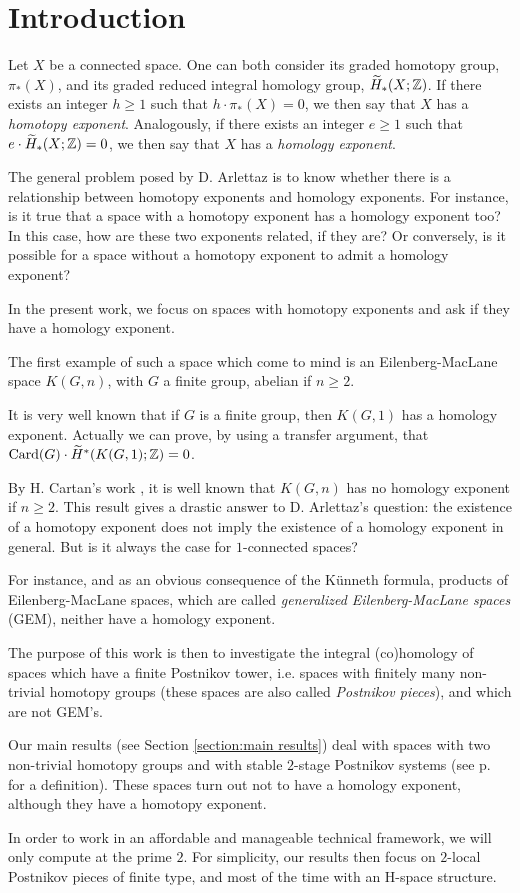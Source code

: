 \chapter{Introduction}

Let $X$ be a connected space. One can both consider its graded homotopy group, $\pi_*(X)$, and its graded reduced integral homology group, $\widetilde{H}_*(X;\mathbb{Z})$. If there exists an integer $h\geq1$ such that $h\cdot\pi_*(X)=0$, we then say that $X$ has a {\it homotopy exponent}. Analogously, if there exists an integer $e\geq1$ such that $e\cdot\widetilde{H}_*(X;\mathbb{Z})=0$, we then say that $X$ has a {\it homology exponent}. 

The general problem posed by D. Arlettaz is to know whether there is a relationship between homotopy exponents and homology exponents. For instance, is it true that a space with a homotopy exponent has a homology exponent too? In this case, how are these two exponents related, if they are? Or conversely, is it possible for a space without a homotopy exponent to admit a homology exponent?

In the present work, we focus on spaces with homotopy exponents and ask if they have a homology exponent.

The first example of such a space which come to mind is an Eilenberg-MacLane space $K(G,n)$, with $G$ a finite group, abelian if $n\geq2$. 

It is very well known that if $G$ is a finite group, then $K(G,1)$ has a homology exponent. Actually we can prove, by using a transfer argument, that $\operatorname{Card}(G)\cdot\widetilde{H}^*(K(G,1);\mathbb{Z})=0$.

By H. Cartan's work \cite{Ca55}, it is well known that $K(G,n)$ has no homology exponent if $n\geq2$. This result gives a drastic answer to D. Arlettaz's question: the existence of a homotopy exponent does not imply the existence of a homology exponent in general. But is it always the case for $1$-connected spaces?

For instance, and as an obvious consequence of the K\"unneth formula, products of Eilenberg-MacLane spaces, which are called {\it generalized Eilenberg-MacLane spaces} (GEM), neither have a homology exponent.

The purpose of this work is then to investigate the integral (co)homology of spaces which have a finite Postnikov tower, i.e. spaces with finitely many non-trivial homotopy groups (these spaces are also called {\it Postnikov pieces}), and which are not GEM's.

Our main results (see Section \ref{section:main results}) deal with spaces with two non-trivial homotopy groups and with stable $2$-stage Postnikov systems (see p. \pageref{d:two-stage Postnikov system} for a definition). These spaces turn out not to have a homology exponent, although they have a homotopy exponent.

In order to work in an affordable and manageable technical framework, we will only compute at the prime $2$. For simplicity, our results then focus on $2$-local Postnikov pieces of finite type, and most of the time with an H-space structure.
\newpage


\newpage

\newpage

\newpage

\newpage

